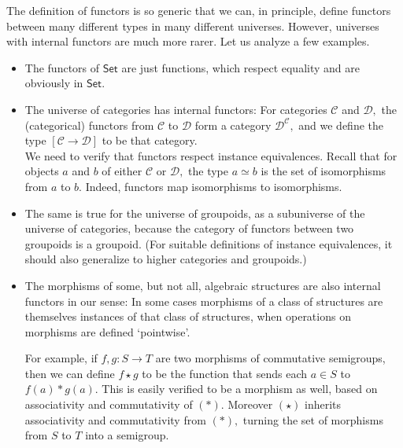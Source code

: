 \documentclass[a4paper]{article}
\theoremstyle{definition}
\theoremstyle{remark}
\renewcommand{\equiv}{\simeq}
\newcommand{\C}{\mathcal{C}}
\newcommand{\D}{\mathcal{D}}
\newcommand{\nm}{\mathsf}
\newcommand{\universe}{\nm}
\newcommand{\Set}{\universe{Set}}
\begin{document}
The definition of functors is so generic that we can, in principle, define functors between
many different types in many different universes. However, universes with internal functors
are much more rarer. Let us analyze a few examples.
\begin{itemize}
  \item The functors of $\Set$ are just functions, which respect equality and are obviously
  in $\Set$.
  \item The universe of categories has internal functors: For categories $\C$ and $\D,$ the
  (categorical) functors from $\C$ to $\D$ form a category $\D^\C,$ and we define the type
  $[\C \to \D]$ to be that category.\\
  We need to verify that functors respect instance equivalences. Recall that for objects
  $a$ and $b$ of either $\C$ or $\D,$ the type $a \equiv b$ is the set of isomorphisms from
  $a$ to $b.$ Indeed, functors map isomorphisms to isomorphisms.
  \item The same is true for the universe of groupoids, as a subuniverse of the universe of
  categories, because the category of functors between two groupoids is a groupoid. (For
  suitable definitions of instance equivalences, it should also generalize to higher
  categories and groupoids.)
  \item The morphisms of some, but not all, algebraic structures are also internal functors
  in our sense: In some cases morphisms of a class of structures are themselves instances
  of that class of structures, when operations on morphisms are defined `pointwise'.

  For example, if $f,g : S \to T$ are two morphisms of commutative semigroups, then we can
  define $f \star g$ to be the function that sends each $a \in S$ to $f(a) \ast g(a).$ This
  is easily verified to be a morphism as well, based on associativity and commutativity
  of $(\ast).$ Moreover $(\star)$ inherits associativity and commutativity from $(\ast),$
  turning the set of morphisms from $S$ to $T$ into a semigroup.


\end{itemize}
\end{document}
